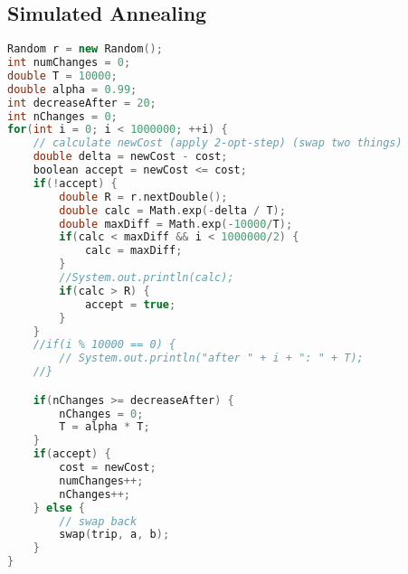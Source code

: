 \subsection{Simulated Annealing}
\begin{lstlisting}[language=C++]
Random r = new Random();
int numChanges = 0;
double T = 10000;
double alpha = 0.99;
int decreaseAfter = 20;
int nChanges = 0;
for(int i = 0; i < 1000000; ++i) {
	// calculate newCost (apply 2-opt-step) (swap two things)
	double delta = newCost - cost;
	boolean accept = newCost <= cost;
	if(!accept) {
		double R = r.nextDouble();
		double calc = Math.exp(-delta / T);
		double maxDiff = Math.exp(-10000/T);
		if(calc < maxDiff && i < 1000000/2) {
			calc = maxDiff;
		}
		//System.out.println(calc);
		if(calc > R) {
			accept = true;
		}
	}
	//if(i % 10000 == 0) {
		// System.out.println("after " + i + ": " + T);
	//}

	if(nChanges >= decreaseAfter) {
		nChanges = 0;
		T = alpha * T;
	}
	if(accept) {
		cost = newCost;
		numChanges++;
		nChanges++;
	} else {
		// swap back
		swap(trip, a, b);
	}
}
\end{lstlisting}